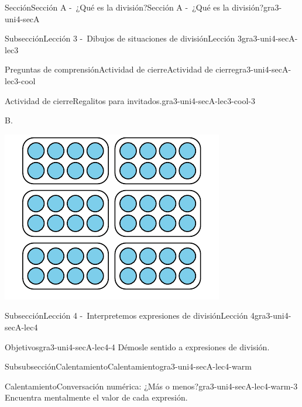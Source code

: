 \documentclass[twoside,10pt,]{article}
\begin{document}
\begin{sectionptx}{Sección}{Sección A -~¿Qué es la división?}{}{Sección A -~¿Qué es la división?}{}{}{gra3-uni4-secA}
\begin{subsectionptx}{Subsección}{Lección 3 -~Dibujos de situaciones de división}{}{Lección 3}{}{}{gra3-uni4-secA-lec3}
\begin{reading-questions-subsubsection}{Preguntas de comprensión}{Actividad de cierre}{}{Actividad de cierre}{}{}{gra3-uni4-secA-lec3-cool}
\begin{project}{Actividad de cierre}{Regalitos para invitados.}{gra3-uni4-secA-lec3-cool-3}
\begin{sidebyside}{2}{0}{0}{0}
\begin{sbspanel}{0.5}
\end{sbspanel}%
\begin{sbspanel}{0.5}%
B.%
\par
\includegraphics[width=\linewidth]{external/svg-source/tikz-file-246307.pdf}
\end{sbspanel}%
\end{sidebyside}%
\end{project}%
\end{reading-questions-subsubsection}
\end{subsectionptx}
%
%
\typeout{************************************************}
\typeout{************************************************}
%
\begin{subsectionptx}{Subsección}{Lección 4 -~Interpretemos expresiones de división}{}{Lección 4}{}{}{gra3-uni4-secA-lec4}
\begin{objectives}{Objetivos}{gra3-uni4-secA-lec4-4}
Démosle sentido a expresiones de división.%
\end{objectives}
%
%
\typeout{************************************************}
\typeout{************************************************}
%
\begin{subsubsectionptx}{Subsubsección}{Calentamiento}{}{Calentamiento}{}{}{gra3-uni4-secA-lec4-warm}
\begin{exploration}{Calentamiento}{Conversación numérica: ¿Más o menos?}{gra3-uni4-secA-lec4-warm-3}%
Encuentra mentalmente el valor de cada expresión.%
%
\begin{multicols}{2}

\end{multicols}
\end{exploration}
\end{subsubsectionptx}
\end{subsectionptx}
\end{sectionptx}
\end{document}

